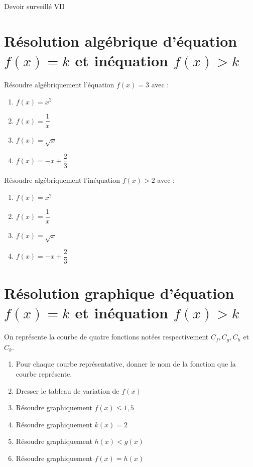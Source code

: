 \documentclass[french]{book}
\begin{document}
\begin{center}
\huge{ Devoir surveillé VII}
\end{center}
 
\vspace{1cm}
\pagestyle{empty}

\section*{Résolution algébrique d’équation $f(x)=k$ et inéquation $f(x)>k$ }

Résoudre algébriquement l’équation $f(x)=3$ avec : \\

\begin{enumerate}
\item $f(x)=x^2 $
\item $f(x)=\dfrac{1}{x}$
\item $f(x)=\sqrt{x}$
\item $f(x)=-x+ \dfrac{2}{3} $
\end{enumerate}

Résoudre algébriquement l’inéquation $f(x)>2$ avec : \\

\begin{enumerate}
\item $f(x)=x^2 $
\item $f(x)=\dfrac{1}{x}$
\item $f(x)=\sqrt{x}$
\item $f(x)=-x+ \dfrac{2}{3} $
\end{enumerate}

\section*{ Résolution graphique d’équation $f(x)=k$ et inéquation $f(x)>k$ }

On représente la courbe de quatre fonctions notées respectivement $C_f,C_g,C_h$ et $C_k$.

\begin{enumerate}
\item Pour chaque courbe représentative, donner le nom de la fonction que la courbe représente.
\item Dresser le tableau de variation de $f(x)$
\item Résoudre graphiquement $f(x) \leq 1,5$
\item Résoudre graphiquement $k(x) = 2$
\item Résoudre graphiquement $h(x)<g(x)$
\item Résoudre graphiquement $f(x)=h(x)$
\end{enumerate}
\end{document}

